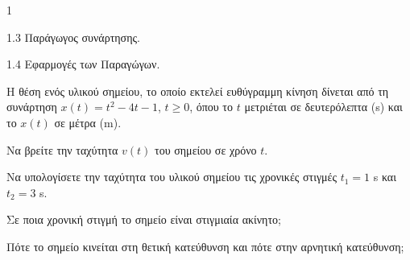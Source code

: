 \begin{ylh}{1}
    \item 1.3 Παράγωγος συνάρτησης.
    \item 1.4 Εφαρμογές των Παραγώγων.
\end{ylh}
Η θέση ενός υλικού σημείου, το οποίο εκτελεί ευθύγραμμη κίνηση δίνεται από τη συνάρτηση $x(t) = t^2 - 4t - 1$, $t \ge 0$, όπου το $t$ μετριέται σε δευτερόλεπτα (s) και το $x(t)$ σε μέτρα (m).
\begin{alist}
    \item Να βρείτε την ταχύτητα $v(t)$ του σημείου σε χρόνο $t$. 
    \item Να υπολογίσετε την ταχύτητα του υλικού σημείου τις χρονικές στιγμές $t_1 = 1$ s και $t_2 = 3$ s. 
    \item Σε ποια χρονική στιγμή το σημείο είναι στιγμιαία ακίνητο; 
    \item Πότε το σημείο κινείται στη θετική κατεύθυνση και πότε στην αρνητική κατεύθυνση; 
\end{alist}

